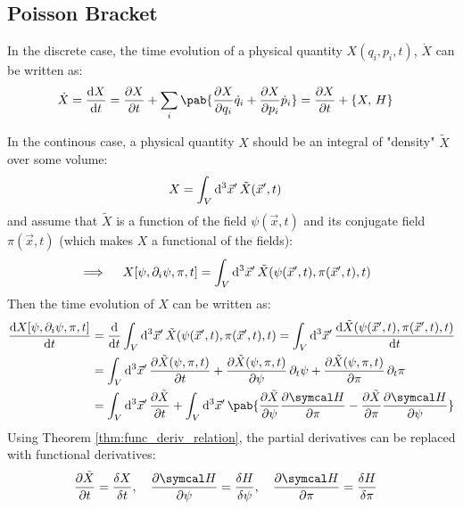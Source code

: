 \subsection{Poisson Bracket}
In the discrete case, the time evolution of a physical quantity $X(q_i, p_i, t)$, $\dot{X}$ can be written as:
\begin{align}
  \dot{X} =  \odv{X}{t} & =\pdv{X}{t} + \sum_i \pab{\pdv{X}{q_i} \dot{q}_i + \pdv{X}{p_i} \dot{p}_i} = \pdv{X}{t} + \pobra{X}{H}
\end{align}

In the continous case, a physical quantity $X$ should be an integral of "density" $\tilde{X}$ over some volume:
\begin{align}
  X & = \int_V \odif[3]{\vec{x}^{\prime}} \, \tilde{X}(\vec{x}^{\prime}, t)
\end{align}
and assume that $\tilde{X}$ is a function of the field $\psi(\vec{x}, t)$ and its conjugate field $\pi(\vec{x}, t)$ (which makes $X$ a functional of the fields):
\begin{align}
  \implies \quad X[\psi, \pdif{i} \psi, \pi, t] & = \int_V \odif[3]{\vec{x}^{\prime}} \, \tilde{X}(\psi(\vec{x}^{\prime}, t), \pi(\vec{x}^{\prime}, t), t)
\end{align}
Then the time evolution of $X$ can be written as:
\begin{align}
  \odv{X[\psi, \pdif{i} \psi, \pi, t]}{t}
   & = \odv{}{t} \int_V \odif[3]{\vec{x}^{\prime}} \, \tilde{X}(\psi(\vec{x}^{\prime}, t), \pi(\vec{x}^{\prime}, t), t) = \int_V \odif[3]{\vec{x}^{\prime}} \, \odv{\tilde{X}(\psi(\vec{x}^{\prime}, t), \pi(\vec{x}^{\prime}, t), t)}{t} \\
   & = \int_V \odif[3]{\vec{x}^{\prime}} \, \pdv{\tilde{X}(\psi, \pi, t)}{t}
  + \pdv{\tilde{X}(\psi, \pi, t)}{\psi} \pdif{t} \psi
  + \pdv{\tilde{X}(\psi, \pi, t)}{\pi} \pdif{t} \pi                                                                                                                                                                                       \\
   & = \int_V \odif[3]{\vec{x}^{\prime}} \, \pdv{\tilde{X}}{t}
  + \int_V \odif[3]{\vec{x}^{\prime}} \, \pab{\pdv{\tilde{X}}{\psi} \pdv{\hami}{\pi} - \pdv{\tilde{X}}{\pi} \pdv{\hami}{\psi}}
\end{align}
Using Theorem \ref{thm:func_deriv_relation}, the partial derivatives can be replaced with functional derivatives:
\begin{align}
  \pdv{\tilde{X}}{t} & = \fdv{X}{t}, \quad \pdv{\hami}{\psi} = \fdv{H}{\psi}, \quad \pdv{\hami}{\pi} = \fdv{H}{\pi}
\end{align}

